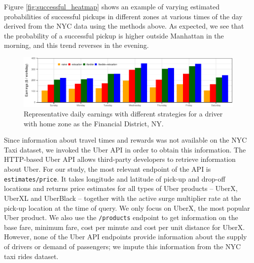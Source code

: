 Figure \ref{fig:successful_heatmap} shows an example of varying estimated probabilities of successful pickups 
  in different zones at various times of the day derived from the NYC data using the methods above. 
As expected, we see that the probability of a successful pickup is higher outside Manhattan in the morning, 
  and this trend reverses in the evening.

\begin{figure}
	\centering
	\includegraphics{figures/daily_earnings.pdf}
	\caption{Representative daily earnings with different strategies for a driver with home zone as the Financial District, NY.}
	\label{fig:daily_earnings}
\end{figure}

 Since information about travel times 
and rewards was not available on the NYC Taxi dataset, we invoked the Uber API in order
to obtain this information.
The HTTP-based Uber API allows third-party developers to retrieve information about Uber. For our study, the most relevant endpoint of the API is \texttt{estimates/price}. It takes longitude and latitude of pick-up and drop-off locations and returns price estimates for all types of Uber products -- UberX, UberXL and UberBlack --  together with the active surge multiplier rate at the pick-up location at the time of query.  We only focus on UberX, the most popular Uber product. We also use the \texttt{/products} endpoint to get information on the base fare, minimum fare, cost per minute and cost per unit distance for UberX. However, none of the Uber API endpoints provide information about the supply of  drivers or demand of passengers; we impute this 
information from the NYC taxi rides dataset.

